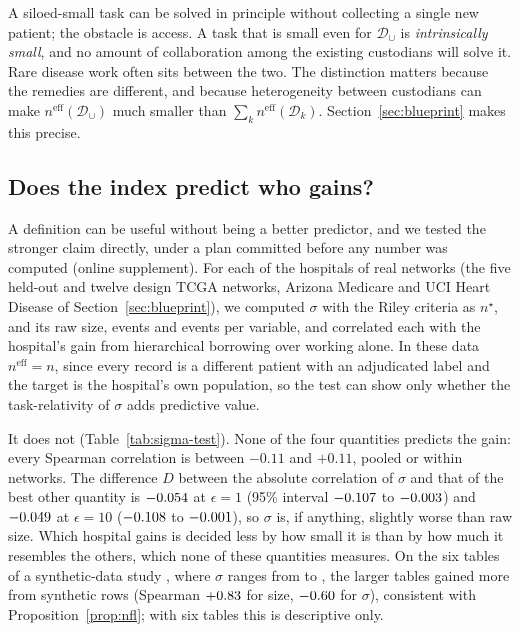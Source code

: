 \documentclass[acmsmall,screen,review]{acmart}
\newcommand{\eff}{\mathrm{eff}}
\theoremstyle{acmdefinition}
\begin{document}
A siloed-small task can be solved in principle without collecting a single new patient; the obstacle is access. A task that is small even for $\mathcal{D}_{\cup}$ is \emph{intrinsically small}, and no amount of collaboration among the existing custodians will solve it. Rare disease work often sits between the two. The distinction matters because the remedies are different, and because heterogeneity between custodians can make $n^{\eff}(\mathcal{D}_{\cup})$ much smaller than $\sum_k n^{\eff}(\mathcal{D}_k)$. Section~\ref{sec:blueprint} makes this precise.

\subsection{Does the index predict who gains?}\label{sec:sigma-test}

A definition can be useful without being a better predictor, and we tested the stronger claim directly, under a plan committed before any number was computed (online supplement). For each of the \SgHospOne{} hospitals of \SgNets{} real networks (the five held-out and twelve design TCGA networks, Arizona Medicare and UCI Heart Disease of Section~\ref{sec:blueprint}), we computed $\sigma$ with the Riley criteria as $n^{\star}$, and its raw size, events and events per variable, and correlated each with the hospital's gain from hierarchical borrowing over working alone. In these data $n^{\eff}=n$, since every record is a different patient with an adjudicated label and the target is the hospital's own population, so the test can show only whether the task-relativity of $\sigma$ adds predictive value.

It does not (Table~\ref{tab:sigma-test}). None of the four quantities predicts the gain: every Spearman correlation is between $-0.11$ and $+0.11$, pooled or within networks. The difference $D$ between the absolute correlation of $\sigma$ and that of the best other quantity is $-0.054$ at $\epsilon=1$ (95\% interval $-0.107$ to $-0.003$) and $-0.049$ at $\epsilon=10$ ($-0.108$ to $-0.001$), so $\sigma$ is, if anything, slightly worse than raw size. Which hospital gains is decided less by how small it is than by how much it resembles the others, which none of these quantities measures. On the six tables of a synthetic-data study \cite{simoes2026synthagent}, where $\sigma$ ranges from \SgSynSigmaMin{} to \SgSynSigmaMax, the larger tables gained more from synthetic rows (Spearman $+0.83$ for size, $-0.60$ for $\sigma$), consistent with Proposition~\ref{prop:nfl}; with six tables this is descriptive only.
\end{document}
